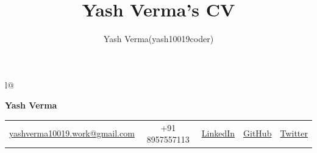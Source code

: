 \documentclass[letterpaper,1pt]{article}
\title{Yash Verma's CV}
\author{Yash Verma(yash10019coder)}
\begin{document}

\begin{tabular*}{\textwidth}{l@{\extracolsep{\fill}}}

  \textbf{{\LARGE Yash Verma}} \vspace{.7em} \\
  \hspace{3.5 mm}

  \hspace{-6mm}
  \begin{tabular}{c|c|c|c|c}
    \faEnvelope  \hspace{0.5mm} \href{mailto:yashverma10019.work@gmail.com}{yashverma10019.work@gmail.com}
    \hspace{1mm} & \hspace{1mm}

    \faPhone  \hspace{0.5mm} +91 8957557113
    \hspace{1mm} & \hspace{1mm}
    \faLinkedin\hspace{0.5mm}\href{https://www.linkedin.com/in/yash10019coder/}{LinkedIn}
    \hspace{1mm} & \hspace{1mm}
    \faGithub \hspace{0.5mm} \href{https://github.com/yash10019coder/}{GitHub} \hspace{1mm}
                 & \hspace{1mm}
    \faTwitter \hspace{0.5mm} \href{https://twitter.com/yash10019coder}{Twitter} \\
  \end{tabular}
\end{tabular*}
\end{document}
